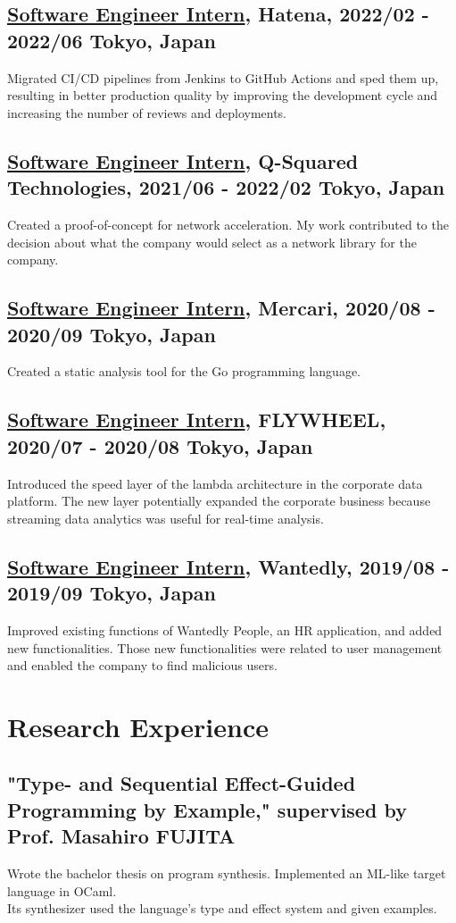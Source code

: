 \documentclass[10pt]{article}
\begin{document}
  \subsection*{\underline{Software Engineer Intern}, Hatena, 2022/02 - 2022/06 \hfill Tokyo, Japan}
    Migrated CI/CD pipelines from Jenkins to GitHub Actions and sped them up, resulting in better production quality by improving the development cycle and increasing the number of reviews and deployments.
  \subsection*{\underline{Software Engineer Intern}, Q-Squared Technologies, 2021/06 - 2022/02 \hfill Tokyo, Japan}
    Created a proof-of-concept for network acceleration.
    My work contributed to the decision about what the company would select as a network library for the company.
  \subsection*{\underline{Software Engineer Intern}, Mercari, 2020/08 - 2020/09 \hfill Tokyo, Japan}
    Created a static analysis tool for the Go programming language.
  \subsection*{\underline{Software Engineer Intern}, FLYWHEEL, 2020/07 - 2020/08 \hfill Tokyo, Japan}
    Introduced the speed layer of the lambda architecture in the corporate data platform.
    The new layer potentially expanded the corporate business because streaming data analytics was useful for real-time analysis.
  \subsection*{\underline{Software Engineer Intern}, Wantedly, 2019/08 - 2019/09 \hfill Tokyo, Japan}
    Improved existing functions of Wantedly People, an HR application, and added new functionalities.
    Those new functionalities were related to user management and enabled the company to find malicious users.

\section*{Research Experience}
  \subsection*{"Type- and Sequential Effect-Guided Programming by Example," supervised by Prof. Masahiro FUJITA}
    Wrote the bachelor thesis on program synthesis.
    Implemented an ML-like target language in OCaml.
    \\
    Its synthesizer used the language's type and effect system and given examples.
\end{document}
